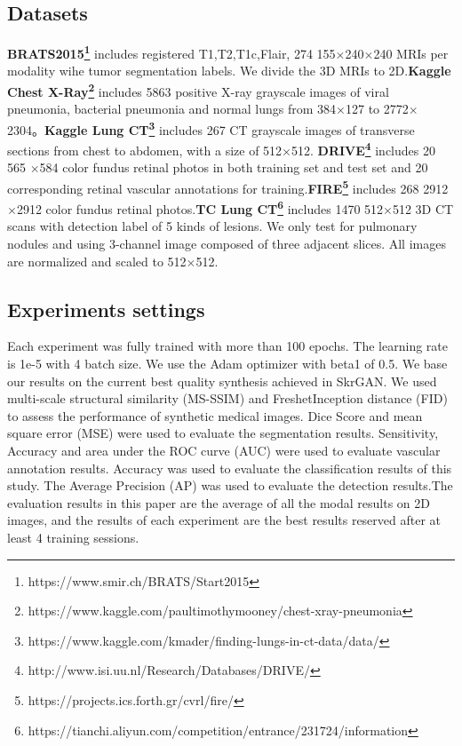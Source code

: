 \documentclass[runningheads]{llncs}
\begin{document}
\subsection{Datasets}
\textbf{BRATS2015\footnote{https://www.smir.ch/BRATS/Start2015}} includes registered T1,T2,T1c,Flair, 274 155$\times$240$\times$240 MRIs per modality wihe tumor segmentation labels. We divide the 3D MRIs to 2D.\textbf{Kaggle Chest X-Ray\footnote{https://www.kaggle.com/paultimothymooney/chest-xray-pneumonia }} includes 5863 positive X-ray grayscale images of viral pneumonia, bacterial pneumonia and normal lungs from 384$\times$127 to 2772$\times$2304。\textbf{Kaggle Lung CT\footnote{https://www.kaggle.com/kmader/finding-lungs-in-ct-data/data/}} includes 267  CT grayscale images of transverse sections from chest to abdomen, with a size of 512$\times$512. \textbf{DRIVE\footnote{http://www.isi.uu.nl/Research/Databases/DRIVE/}} includes 20 565 $\times $584 color fundus retinal photos in both training set and test set and 20 corresponding retinal vascular annotations for training.\textbf{FIRE\footnote{https://projects.ics.forth.gr/cvrl/fire/}} includes 268 2912$\times$2912 color fundus retinal photos.\textbf{TC Lung CT\footnote{https://tianchi.aliyun.com/competition/entrance/231724/information}} includes 1470 512$\times$512 3D CT scans with detection label of 5 kinds of lesions. We only test for pulmonary nodules and using 3-channel image composed of three adjacent slices. All images are normalized and scaled to 512$\times$512.

\subsection{Experiments settings}
Each experiment was fully trained with more than 100 epochs. The learning rate is 1e-5 with 4 batch size. We use the Adam optimizer with beta1 of 0.5.
We base our results on the current best quality synthesis achieved in SkrGAN\cite{96zhang2019skrgan:}. We used multi-scale structural similarity (MS-SSIM) and FreshetInception distance (FID)\cite{148karras2017progressive} to assess the performance of synthetic medical images. Dice Score\cite {95dice1945measures} and mean square error (MSE) were used to evaluate the segmentation results. Sensitivity, Accuracy and area under the ROC curve (AUC) were used to evaluate vascular annotation results. Accuracy was used to evaluate the classification results of this study. The Average Precision (AP) was used to evaluate the detection results.The evaluation results in this paper are the average of all the modal results on 2D images, and the results of each experiment are the best results reserved after at least 4 training sessions.
\end{document}
